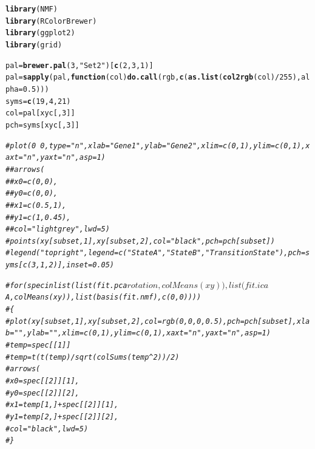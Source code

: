 \documentclass{article}\usepackage[]{graphicx}\usepackage[]{color}
\makeatletter
\newcommand{\hlnum}[1]{\textcolor[rgb]{0.686,0.059,0.569}{#1}}%
\newcommand{\hlstr}[1]{\textcolor[rgb]{0.192,0.494,0.8}{#1}}%
\newcommand{\hlcom}[1]{\textcolor[rgb]{0.678,0.584,0.686}{\textit{#1}}}%
\newcommand{\hlopt}[1]{\textcolor[rgb]{0,0,0}{#1}}%
\newcommand{\hlstd}[1]{\textcolor[rgb]{0.345,0.345,0.345}{#1}}%
\newcommand{\hlkwa}[1]{\textcolor[rgb]{0.161,0.373,0.58}{\textbf{#1}}}%
\newcommand{\hlkwb}[1]{\textcolor[rgb]{0.69,0.353,0.396}{#1}}%
\newcommand{\hlkwc}[1]{\textcolor[rgb]{0.333,0.667,0.333}{#1}}%
\newcommand{\hlkwd}[1]{\textcolor[rgb]{0.737,0.353,0.396}{\textbf{#1}}}%
\newenvironment{kframe}{%
 \def\at@end@of@kframe{}%
 \ifinner\ifhmode%
  \def\at@end@of@kframe{\end{minipage}}%
  \begin{minipage}{\columnwidth}%
 \fi\fi%
 \def\FrameCommand##1{\hskip\@totalleftmargin \hskip-\fboxsep
 \colorbox{shadecolor}{##1}\hskip-\fboxsep
     \hskip-\linewidth \hskip-\@totalleftmargin \hskip\columnwidth}%
 \MakeFramed {\advance\hsize-\width
   \@totalleftmargin\z@ \linewidth\hsize
   \@setminipage}}%
 {\par\unskip\endMakeFramed%
 \at@end@of@kframe}
\newenvironment{knitrout}{}{} %
\makeatother
\begin{document}
\begin{knitrout}
\color{fgcolor}\begin{kframe}
\begin{alltt}
\hlkwd{library}\hlstd{(NMF)}
\hlkwd{library}\hlstd{(RColorBrewer)}
\hlkwd{library}\hlstd{(ggplot2)}
\hlkwd{library}\hlstd{(grid)}

\hlstd{pal} \hlkwb{=} \hlkwd{brewer.pal}\hlstd{(}\hlnum{3}\hlstd{,} \hlstr{"Set2"}\hlstd{)[}\hlkwd{c}\hlstd{(}\hlnum{2}\hlstd{,} \hlnum{3}\hlstd{,} \hlnum{1}\hlstd{)]}
\hlstd{pal} \hlkwb{=} \hlkwd{sapply}\hlstd{(pal,} \hlkwa{function}\hlstd{(}\hlkwc{col}\hlstd{)} \hlkwd{do.call}\hlstd{(rgb,} \hlkwd{c}\hlstd{(}\hlkwd{as.list}\hlstd{(}\hlkwd{col2rgb}\hlstd{(col)}\hlopt{/}\hlnum{255}\hlstd{),} \hlkwc{alpha} \hlstd{=} \hlnum{0.5}\hlstd{)))}
\hlstd{syms} \hlkwb{=} \hlkwd{c}\hlstd{(}\hlnum{19}\hlstd{,} \hlnum{4}\hlstd{,} \hlnum{21}\hlstd{)}
\hlstd{col} \hlkwb{=} \hlstd{pal[xyc[,}\hlnum{3}\hlstd{]]}
\hlstd{pch} \hlkwb{=} \hlstd{syms[xyc[,}\hlnum{3}\hlstd{]]}

\hlcom{# plot(0 ~ 0, type = "n", xlab = "Gene 1", ylab = "Gene 2", xlim = c(0, 1), ylim = c(0, 1), xaxt = "n", yaxt = "n", asp = 1)}
\hlcom{# # arrows(}
\hlcom{# # 	x0 = c(0, 0), }
\hlcom{# # 	y0 = c(0, 0), }
\hlcom{# # 	x1 = c(0.5, 1), }
\hlcom{# # 	y1 = c(1, 0.45), }
\hlcom{# # 	col = "lightgrey", lwd = 5)}
\hlcom{# points(xy[subset,1], xy[subset,2], col = "black", pch = pch[subset])}
\hlcom{# legend("topright", legend = c("State A", "State B", "Transition State"), pch = syms[c(3, 1, 2)], inset = 0.05)}

\hlcom{# for (spec in list(list(fit.pca$rotation, colMeans(xy)), list(fit.ica$A, colMeans(xy)), list(basis(fit.nmf), c(0, 0))))}
\hlcom{# \{}
\hlcom{# 	plot(xy[subset,1], xy[subset,2], col = rgb(0, 0, 0, 0.5), pch = pch[subset], xlab = "", ylab = "", xlim = c(0, 1), ylim = c(0, 1), xaxt = "n", yaxt = "n", asp = 1)}
\hlcom{# 	temp = spec[[1]]}
\hlcom{# 	temp = t(t(temp) / sqrt(colSums(temp^2)) / 2)}
\hlcom{# 	arrows(}
\hlcom{# 		x0 = spec[[2]][1], }
\hlcom{# 		y0 = spec[[2]][2], }
\hlcom{# 		x1 = temp[1,] + spec[[2]][1], }
\hlcom{# 		y1 = temp[2,] + spec[[2]][2], }
\hlcom{# 		col = "black", lwd = 5)}
\hlcom{# \}}


\end{alltt}
\end{kframe}
\end{knitrout}
\end{document}
